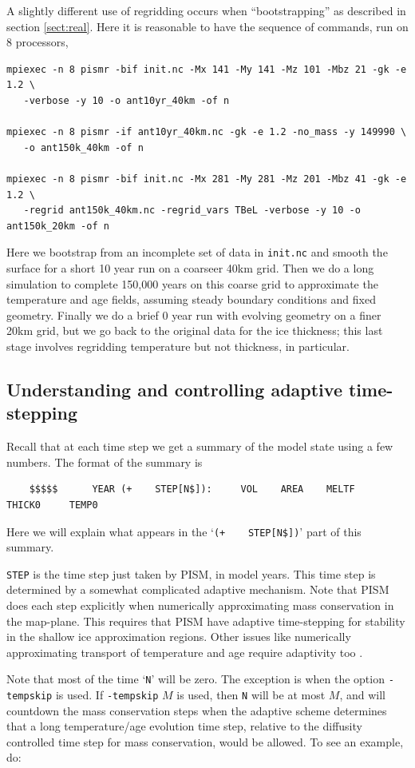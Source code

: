 \documentclass[12pt,final]{amsart}
\begin{document}
A slightly different use of regridding occurs when ``bootstrapping'' as described in section \ref{sect:real}.  Here it is reasonable to have the sequence of commands, run on 8 processors,
\small
\begin{verbatim}
mpiexec -n 8 pismr -bif init.nc -Mx 141 -My 141 -Mz 101 -Mbz 21 -gk -e 1.2 \
   -verbose -y 10 -o ant10yr_40km -of n

mpiexec -n 8 pismr -if ant10yr_40km.nc -gk -e 1.2 -no_mass -y 149990 \
   -o ant150k_40km -of n

mpiexec -n 8 pismr -bif init.nc -Mx 281 -My 281 -Mz 201 -Mbz 41 -gk -e 1.2 \
   -regrid ant150k_40km.nc -regrid_vars TBeL -verbose -y 10 -o ant150k_20km -of n
\end{verbatim}
\normalsize
Here we bootstrap from an incomplete set of data in \verb|init.nc| and smooth the surface for a short 10 year run on a coarseer 40km grid.  Then we do a long simulation to complete 150,000 years on this coarse grid to approximate the temperature and age fields, assuming steady boundary conditions and fixed geometry.  Finally we do a brief 0 year run with evolving geometry on a finer 20km grid, but we go back to the original data for the ice thickness; this last stage involves regridding temperature but not thickness, in particular.

\subsection{Understanding and controlling adaptive time-stepping}  Recall that at each time step we get a summary of the model state using a few numbers.  The format of the summary is
\begin{verbatim}
    $$$$$      YEAR (+    STEP[N$]):     VOL    AREA    MELTF     THICK0     TEMP0
\end{verbatim}
Here we will explain what appears in the `\verb|(+    STEP[N$])|' part of this summary.

\verb|STEP| is the time step just taken by PISM, in model years.  This time step is determined by a somewhat complicated adaptive mechanism.  Note that PISM does each step explicitly when numerically approximating mass conservation in the map-plane.  This requires that PISM have adaptive time-stepping for stability in the shallow ice approximation regions.  Other issues like numerically approximating transport of temperature and age require adaptivity too \cite{BBL}.

Note that most of the time `\verb|N|' will be zero.  The exception is when the option \verb|-tempskip| is used.  If \verb|-tempskip| $M$ is used, then \verb|N| will be at most $M$, and will countdown the mass conservation steps when the adaptive scheme determines that a long temperature/age evolution time step, relative to the diffusity controlled time step for mass conservation, would be allowed.  To see an example, do: 
\end{document}

